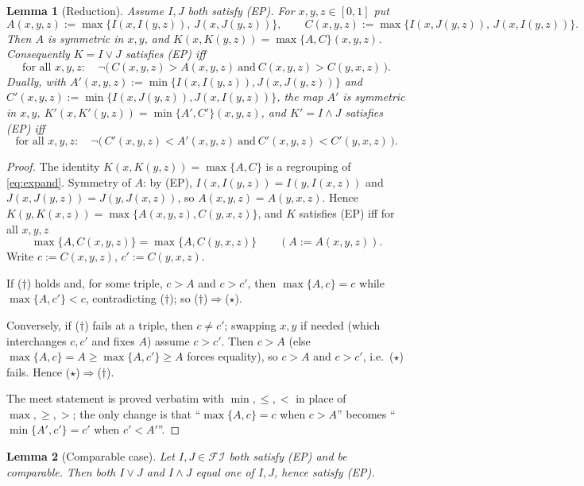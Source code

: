\documentclass{amsart}
\theoremstyle{plain}
\newtheorem{lemma}{Lemma}
\theoremstyle{definition}
\newcommand{\FI}{\mathcal{FI}}
\begin{document}
\begin{lemma}[Reduction]\label{lem:reduction}
Assume $I,J$ both satisfy \textup{(EP)}. For $x,y,z\in[0,1]$ put
\[
A(x,y,z):=\max\{I(x,I(y,z)),\,J(x,J(y,z))\},\qquad
C(x,y,z):=\max\{I(x,J(y,z)),\,J(x,I(y,z))\}.
\]
Then $A$ is symmetric in $x,y$, and $K(x,K(y,z))=\max\{A,C\}(x,y,z)$. Consequently
$K=I\vee J$ satisfies \textup{(EP)} iff
\begin{equation}\label{eq:star}
\text{for all }x,y,z:\quad
\neg\bigl(\,C(x,y,z)>A(x,y,z)\ \text{and}\ C(x,y,z)>C(y,x,z)\,\bigr).
\tag{$\star$}
\end{equation}
Dually, with
$A'(x,y,z):=\min\{I(x,I(y,z)),J(x,J(y,z))\}$ and
$C'(x,y,z):=\min\{I(x,J(y,z)),J(x,I(y,z))\}$, the map $A'$ is symmetric in $x,y$,
$K'(x,K'(y,z))=\min\{A',C'\}(x,y,z)$, and $K'=I\wedge J$ satisfies \textup{(EP)} iff
\begin{equation}\label{eq:starmin}
\text{for all }x,y,z:\quad
\neg\bigl(\,C'(x,y,z)<A'(x,y,z)\ \text{and}\ C'(x,y,z)<C'(y,x,z)\,\bigr).
\tag{$\star'$}
\end{equation}
\end{lemma}

\begin{proof}
The identity $K(x,K(y,z))=\max\{A,C\}$ is a regrouping of \eqref{eq:expand}.
Symmetry of $A$: by (EP), $I(x,I(y,z))=I(y,I(x,z))$ and $J(x,J(y,z))=J(y,J(x,z))$, so
$A(x,y,z)=A(y,x,z)$.  Hence $K(y,K(x,z))=\max\{A(x,y,z),C(y,x,z)\}$, and $K$ satisfies (EP)
iff for all $x,y,z$
\[
\max\{A,C(x,y,z)\}=\max\{A,C(y,x,z)\}\qquad(A:=A(x,y,z)).
\tag{$\dagger$}
\]
Write $c:=C(x,y,z)$, $c':=C(y,x,z)$.

If ($\dagger$) holds and, for some triple, $c>A$ and $c>c'$, then $\max\{A,c\}=c$ while
$\max\{A,c'\}<c$, contradicting ($\dagger$); so ($\dagger$)$\Rightarrow$($\star$).

Conversely, if ($\dagger$) fails at a triple, then $c\ne c'$; swapping $x,y$ if needed
(which interchanges $c,c'$ and fixes $A$) assume $c>c'$.  Then $c>A$ (else
$\max\{A,c\}=A\ge\max\{A,c'\}\ge A$ forces equality), so $c>A$ and $c>c'$, i.e.\ ($\star$)
fails. Hence ($\star$)$\Rightarrow$($\dagger$).

The meet statement is proved verbatim with $\min,\le,<$ in place of $\max,\ge,>$; the only
change is that ``$\max\{A,c\}=c$ when $c>A$'' becomes ``$\min\{A',c'\}=c'$ when $c'<A'$''.
\end{proof}

\begin{lemma}[Comparable case]\label{lem:meet}
Let $I,J\in\FI$ both satisfy \textup{(EP)} and be comparable.  Then both $I\vee J$ and
$I\wedge J$ equal one of $I,J$, hence satisfy \textup{(EP)}.
\end{lemma}
\end{document}
